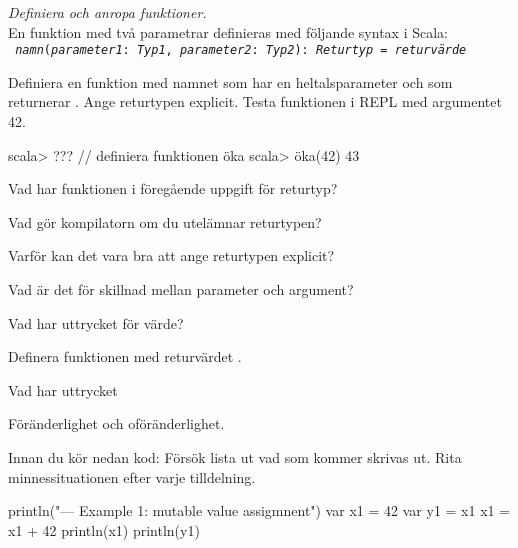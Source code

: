 
\Exercise{\ExeWeekTHREE}

\begin{Goals}
\item 
\end{Goals}

\begin{Preparations}
\item 
\end{Preparations}

\BasicTasks %

\Task \emph{Definiera och anropa funktioner.} 
\\En funktion med två parametrar definieras med följande syntax i Scala: \\ \texttt{ \textit{namn}(\textit{parameter1}: \textit{Typ1}, \textit{parameter2}: \textit{Typ2}): \textit{Returtyp} = \textit{returvärde}}

\Subtask Definiera en funktion med namnet  som har en heltalsparameter  och som returnerar . Ange returtypen explicit. Testa funktionen i REPL med argumentet 42.

\begin{REPL}
scala> ???  // definiera funktionen öka
scala> öka(42)
43
\end{REPL}

\Subtask\Pen Vad har funktionen  i föregående uppgift för returtyp?

\Subtask\Pen Vad gör kompilatorn om du utelämnar returtypen?

\Subtask\Pen Varför kan det vara bra att ange returtypen explicit?

\Subtask\Pen Vad är det för skillnad mellan parameter och argument?
 
\Subtask Vad har uttrycket  för värde?

\Subtask Definera funktionen  med returvärdet .

\Subtask Vad har uttrycket 

\Task Föränderlighet och oföränderlighet.

\Subtask Innan du kör nedan kod: Försök lista ut vad som kommer skrivas ut. Rita minnessituationen efter varje tilldelning.

\begin{Code}
println("\n--- Example 1: mutable value assigmnent")
var x1 = 42
var y1 = x1
x1 = x1 + 42
println(x1)
println(y1)
\end{Code}

